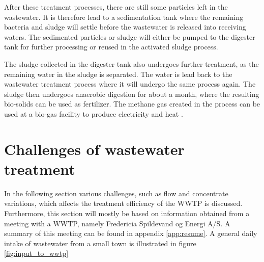 After these treatment processes, there are still some particles left in the wastewater. It is therefore lead to a sedimentation tank where the remaining bacteria and sludge will settle before the wastewater is released into receiving waters. The sedimented particles or sludge will either be pumped to the digester tank for further processing or reused in the activated sludge process.


The sludge collected in the digester tank also undergoes further treatment, as the remaining water in the sludge is separated. The water is lead back to the wastewater treatment process where it will undergo the same process again. The sludge then undergoes anaerobic digestion for about a month, where the resulting bio-solids can be used as fertilizer. The methane gas created in the process can be used at a bio-gas facility to produce electricity and heat \cite{wwtp_ekstra}.


\section{Challenges of wastewater treatment}\label{sec:WWTP_challenges}
In the following section various challenges, such as flow and concentrate variations, which affects the treatment efficiency of the WWTP is discussed. 
Furthermore, this section will mostly be based on information obtained from a meeting with a WWTP, namely Fredericia Spildevand og Energi A/S. A summary of this meeting can be found in appendix \ref{app:resume}.
A general daily intake of wastewater from a small town is illustrated in figure \ref{fig:input_to_wwtp}  

